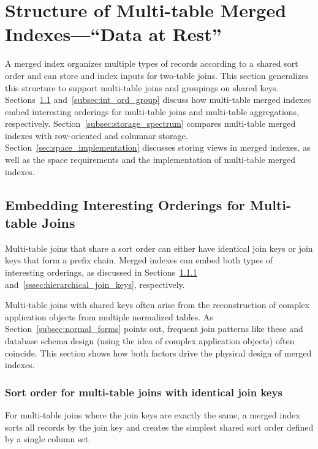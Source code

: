 \documentclass[sigconf, pdfa, nonacm]{acmart}
\begin{document}
\section{Structure of Multi-table Merged Indexes---``Data at Rest''}\label{sec:structure_at_rest} 

A merged index organizes multiple types of records according to a shared sort order and can store and index inputs for two-table joins. This section generalizes this structure to support multi-table joins and groupings on shared keys.
Sections~\ref{subsec:int_ord_cluster} and~\ref{subsec:int_ord_group} discuss how multi-table merged indexes embed interesting orderings for multi-table joins and multi-table aggregations, respectively. Section~\ref{subsec:storage_spectrum} compares multi-table merged indexes with row-oriented and columnar storage.
Section~\ref{sec:space_implementation} discusses storing views in merged indexes, as well as the space requirements and the implementation of multi-table merged indexes.

\subsection{Embedding Interesting Orderings for Multi-table Joins}\label{subsec:int_ord_cluster}

Multi-table joins that share a sort order can either have identical join keys or join keys that form a prefix chain.
Merged indexes can embed both types of interesting orderings, as discussed in Sections~\ref{sssec:identical_join_keys} and~\ref{sssec:hierarchical_join_keys}, respectively.

Multi-table joins with shared keys often arise from the reconstruction of complex application objects from multiple normalized tables. As Section~\ref{subsec:normal_forms} points out, frequent join patterns like these and database schema design (using the idea of complex application objects) often coincide.
This section shows how both factors drive the physical design of merged indexes.

\subsubsection{Sort order for multi-table joins with identical join keys}\label{sssec:identical_join_keys}

For multi-table joins where the join keys are exactly the same, a merged index sorts all records by the join key and creates the simplest shared sort order defined by a single column set.
\end{document}
